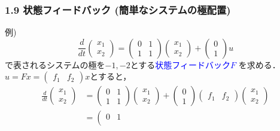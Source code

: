 \documentclass[10pt]{beamer}
\begin{document}
\begin{frame}[t]
\frametitle{1.9 状態フィードバック (簡単なシステムの極配置)}
例)
\begin{equation}
 \frac{d}{dt}
 \left(
 \begin{array}{c}
  x_1 \\
  x_2
 \end{array}
 \right) =
 \left(
 \begin{array}{cc}
  0 & 1\\
  1 & 1
 \end{array}
 \right)
 \left(
 \begin{array}{c}
  x_1 \\
  x_2
 \end{array}
 \right) +
 \left(
 \begin{array}{c}
  0 \\
  1
 \end{array}
 \right) u
\end{equation}
で表されるシステムの極を$-1, -2$とする\textcolor{blue}{状態フィードバック$F$} を求める．
$u = Fx = (\begin{array}{cc}f_1 & f_2\end{array})x$とすると，
\begin{align}
 \frac{d}{dt}
 \left(
 \begin{array}{c}
  x_1 \\
  x_2
 \end{array}
 \right)
 &=
 \left(
 \begin{array}{cc}
  0 & 1\\
  1 & 1
 \end{array}
 \right)
 \left(
 \begin{array}{c}
  x_1 \\
  x_2
 \end{array}
 \right) +
 \left(
 \begin{array}{c}
  0 \\
  1
 \end{array}
 \right)
 \left(
 \begin{array}{cc}
  f_1 & f_2
 \end{array}
 \right)
 \left(
 \begin{array}{c}
  x_1 \\
  x_2
 \end{array}
 \right)
\nonumber \\
 &=
 \left(
 \begin{array}{cc}
  0 & 1\\

\end{array}
\end{align}
\end{frame}
\end{document}
